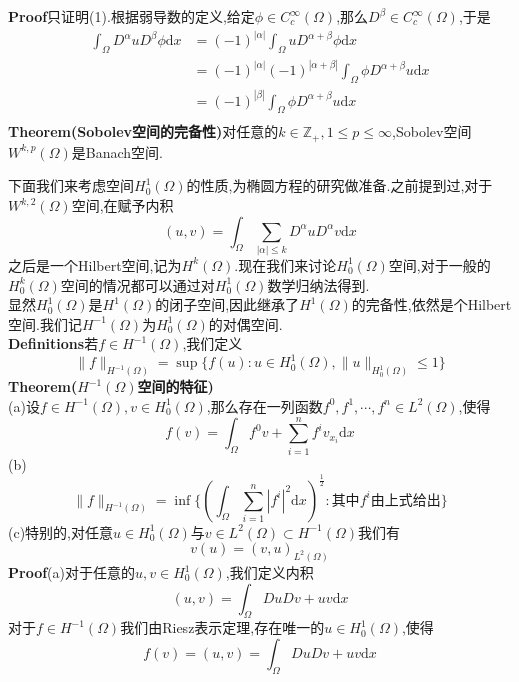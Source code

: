 \documentclass[a4paper,UTF8,12pt]{ctexart}
\begin{document}
\textbf{Proof}\quad 只证明(1).根据弱导数的定义,给定$\phi \in  C^{\infty}_c(\Omega)$,那么$D^{\beta}\in  C^{\infty}_c(\Omega)$,于是
$$
\begin{aligned}
    \int_{\Omega}D^{\alpha}u D^{\beta}\phi\mathrm{d}x &= (-1)^{|\alpha|}\int_{\Omega}u D^{\alpha+\beta}\phi\mathrm{d}x\\
                                                      &= (-1)^{|\alpha|}(-1)^{|\alpha+\beta|}\int_{\Omega}\phi D^{\alpha+\beta}u\mathrm{d}x\\
                                                      &= (-1)^{|\beta|}\int_{\Omega}\phi D^{\alpha+\beta}u\mathrm{d}x\\
\end{aligned}
$$
\textbf{Theorem(Sobolev空间的完备性)}\quad 对任意的$k\in\mathbb{Z}_{+},1\leqslant p\leqslant \infty$,Sobolev空间$W^{k,p}(\Omega)$是Banach空间.\par
下面我们来考虑空间$H^1_0(\Omega)$的性质,为椭圆方程的研究做准备.之前提到过,对于$W^{k,2}(\Omega)$空间,在赋予内积
$$
(u,v)=\int_{\Omega}\sum_{|\alpha|\leqslant k}D^{\alpha}uD^{\alpha}v\mathrm{d}x
$$
之后是一个Hilbert空间,记为$H^k(\Omega)$.现在我们来讨论$H^1_0(\Omega)$空间,对于一般的$H^k_0(\Omega)$空间的情况都可以通过对$H^1_0(\Omega)$数学归纳法得到.\\
显然$H^1_0(\Omega)$是$H^1(\Omega)$的闭子空间,因此继承了$H^1(\Omega)$的完备性,依然是个Hilbert空间.我们记$H^{-1}(\Omega)$为$H^1_0(\Omega)$的对偶空间.\\
\textbf{Definitions}\quad 若$f\in H^{-1}(\Omega)$,我们定义
$$
\|f\|_{H^{-1}(\Omega)} = \sup\{f(u):u\in H^1_0(\Omega),\|u\|_{H^1_0(\Omega)}\leqslant 1 \}
$$
\textbf{Theorem($H^{-1}(\Omega)$空间的特征)}\\
(a)设$f\in H^{-1}(\Omega),v\in H^1_0(\Omega)$,那么存在一列函数$f^0,f^1,\cdots,f^n\in L^2(\Omega)$,使得
$$
f(v) = \int_{\Omega}f^0v+\sum^n_{i=1}f^iv_{x_i}\mathrm{d}x
$$
(b)
$$
\|f\|_{H^{-1}(\Omega)}=\inf\{(\int_{\Omega}\sum^n_{i=1}|f^i|^2\mathrm{d}x)^{\frac{1}{2}}:\text{其中}f^i\text{由上式给出}\}
$$
(c)特别的,对任意$u\in H^1_0(\Omega)$与$v\in L^2(\Omega)\subset H^{-1}(\Omega)$我们有
$$
v(u)=(v,u)_{L^2(\Omega)}
$$
\textbf{Proof}\quad (a)对于任意的$u,v\in H^1_0(\Omega)$,我们定义内积
$$
(u,v)=\int_{\Omega}DuDv+uv\mathrm{d}x
$$
对于$f\in H^{-1}(\Omega)$我们由Riesz表示定理,存在唯一的$u\in H^1_0(\Omega)$,使得
\begin{equation}
    f(v)=(u,v)=\int_{\Omega}DuDv+uv\mathrm{d}x \tag{*}
\end{equation}
\end{document}

